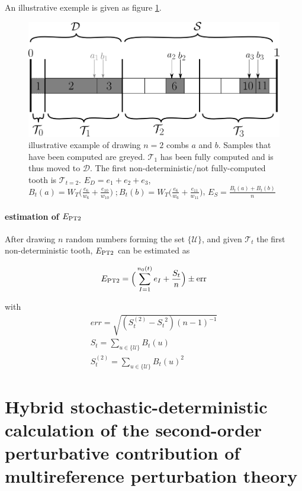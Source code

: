 \documentclass[./thesis.tex]{subfiles}
\begin{document}
An illustrative exemple is given as figure \ref{fig:toothindet}.

 \begin{figure}[h!]
	\begin{center}
		\includegraphics[width=0.9\columnwidth]{figures/pt2/toothindet}
	\end{center}
		\caption{illustrative example of drawing $n=2$ combs $a$ and $b$.	Samples that have been computed are greyed. $\mathcal{T}_1$ has been fully computed and is thus moved to $\mathcal{D}$. The first non-deterministic/not fully-computed tooth is $\mathcal{T}_{t=2}$.
		$ E_D = e_1 + e_2 + e_3 $, 
		$B_t(a) = W_T \Big ( \frac{e_6}{w_6} + \frac{e_{10}}{w_{10}} \Big ) \;;B_t(b) = W_T \Big ( \frac{e_6}{w_6} + \frac{e_{11}}{w_{11}} \Big )$, 
		$E_S = \frac{B_t(a)+B_t(b)}{n}$}
		\label{fig:toothindet}
\end{figure}

\paragraph{estimation of $E_\text{PT2}$}

After drawing $n$ random numbers forming the set $\{\mathcal{U}\}$, and given $\mathcal{T}_t$ the first non-deterministic tooth, $E_\text{PT2}$ can be estimated as 

\begin{equation}
E_\text{PT2} = \Big ( \sum_{I=1}^{n_0(t)} e_I + \frac{S_{t}}{n} \Big ) \pm \text{err}
\end{equation}

with
\begin{align}
err = \sqrt{(S_{t}^{(2)} - {S_{t}}^2) (n-1)^{-1} } \\
S_{t} = \sum_{u \in \{\mathcal{U}\}} B_{t}(u) \\
S^{(2)}_{t} = \sum_{u \in \{\mathcal{U}\}} B_{t}(u)^2
\end{align}

\clearpage

\section{Hybrid stochastic-deterministic calculation of the second-order
perturbative contribution of multireference perturbation theory}

\end{document}

